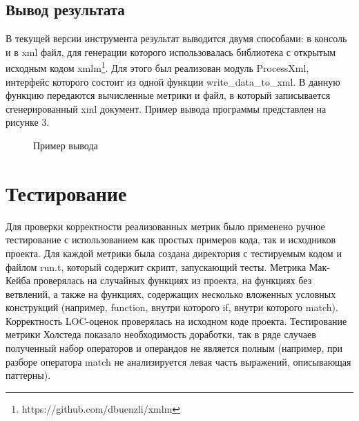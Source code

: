 \subsection{Вывод результата}
В текущей версии инструмента результат выводится двумя способами: в консоль и в xml файл, для генерации которого использовалась библиотека
с открытым исходным кодом xmlm\footnote{https://github.com/dbuenzli/xmlm}. Для этого был
реализован модуль ProcessXml, интерфейс которого состоит из одной функции
write\_data\_to\_xml. В данную функцию передаются вычисленные метрики
и файл, в который записывается сгенерированный xml документ.
Пример вывода программы представлен на рисунке 3.
\begin{figure}[h]
    \caption{Пример вывода}
\end{figure}
\newpage
\section{Тестирование}
Для проверки корректности реализованных метрик было применено ручное тестирование
с использованием как простых примеров кода, так и исходников проекта.  Для каждой
метрики была создана директория с тестируемым кодом и файлом run.t, который содержит
скрипт, запускающий тесты. Метрика Мак-Кейба проверялась на случайных функциях из проекта, на функциях без ветвлений, а также на функциях, содержащих несколько вложенных
условных конструкций (например, function, внутри которого if, внутри которого match). 
Корректность LOC-оценок проверялась на исходном коде проекта. Тестирование метрики Холстеда
показало необходимость доработки, так в ряде случаев полученный набор операторов и операндов
не является полным (например, при разборе оператора match не анализируется левая часть выражений, описывающая паттерны).

